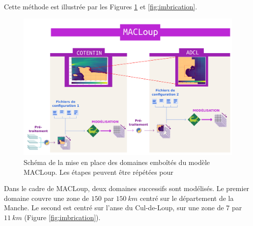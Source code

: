 \documentclass[10pt,a4paper,titlepage]{article}
\begin{document}
Cette méthode est illustrée par les Figures \ref{fig:imbrication_workflow} et \ref{fig:imbrication}.

\begin{figure}[H]
    \centering
    \includegraphics[scale=0.3]{../images/workflow/multi_grid.pdf}
    \caption{Schéma de la mise en place des domaines emboîtés du modèle MACLoup. Les étapes peuvent être répétées pour }
    \label{fig:imbrication_workflow}
\end{figure}

Dans le cadre de MACLoup, deux domaines successifs sont modélisés.
Le premier domaine couvre une zone de $150$ par $150~km$ centré sur le département de la Manche.
Le second est centré sur l'anse du Cul-de-Loup, sur une zone de $7$ par $11~km$ (Figure \ref{fig:imbrication}).

\end{document}
